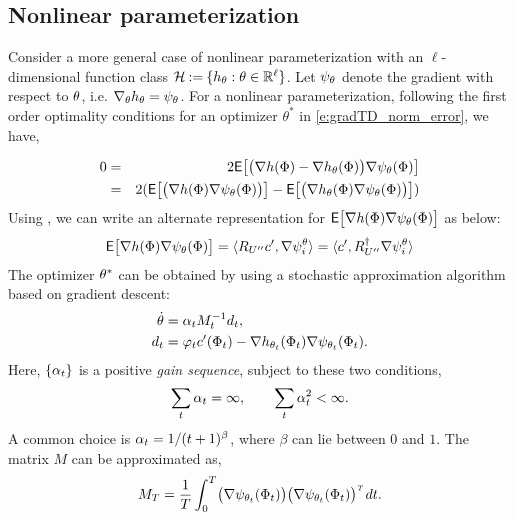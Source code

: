 \subsection{Nonlinear parameterization}
Consider a more general case of nonlinear parameterization with an $\ell$- dimensional function class ${\cal H} \mathbin{:=} \{h_\theta : \theta \in \mathbb{R}^\ell\}$. Let $\psi_\theta$ denote the gradient with respect to $\theta$, i.e. $\nabla_\theta h_\theta = \psi_\theta$. For a nonlinear parameterization, following the first order optimality conditions for an optimizer $\theta^{*}$ in \eqref{e:gradTD_norm_error}, we have,

\begin{eqnarray*}
	0 & = &2 {\sf E} \bigl[\bigl(\nabla h(\Phi) - \nabla h_\theta (\Phi)\bigr) \nabla \psi_\theta (\Phi)\bigr]\\
	& = & 2 ({\sf E} \bigl[\bigl(\nabla h(\Phi)\nabla \psi_\theta (\Phi)\bigr)\bigr] - {\sf E} \bigl[\bigl(\nabla h_\theta (\Phi)\nabla \psi_\theta (\Phi)\bigr)\bigr])
\end{eqnarray*}
Using , we can write an alternate representation for ${\sf E} \bigl[ \nabla h(\Phi)\nabla \psi_\theta (\Phi)\bigr]$ as below:
\begin{eqnarray*}
	{\sf E}\bigl[\nabla h(\Phi)\nabla \psi_\theta (\Phi)\bigr]=\langle R_{U''}c',\nabla \psi_{i}^{\theta}\rangle =\langle c', R_{U''}^\dagger \nabla \psi_{i}^{\theta}\rangle
\end{eqnarray*}
The optimizer $\theta^*$ can be obtained by using a stochastic approximation algorithm based on gradient descent: 
\begin{equation*}
\begin{aligned}
\dot{\theta}&=\alpha_t M_{t}^{-1} d_t, \\ 
d_t & =\varphi_t  c'(\Phi_t)-\nabla h_{\theta_{t}}(\Phi_t)\nabla \psi_{\theta_{t}}(\Phi_t).
\end{aligned}
\end{equation*}
Here, $\{\alpha_t\}$ is a positive \textit{gain sequence}, subject to these two conditions, 
\[
\sum_t \alpha_t = \infty, \qquad \sum_t \alpha_t^2 < \infty.
\]
A common choice is $\alpha_t = 1/(t+1)^\beta$, where $\beta$ can lie between $0$ and $1$. The matrix $M$ can be approximated as,
\[
M_T =\frac{1}{T}\int_0^T\bigl(\nabla \psi_{\theta_t}(\Phi_t)\bigr)\bigl(\nabla \psi_{\theta_t}(\Phi_t)\bigr)^{{\hbox{\tiny\it T}}}\, dt.
\]

